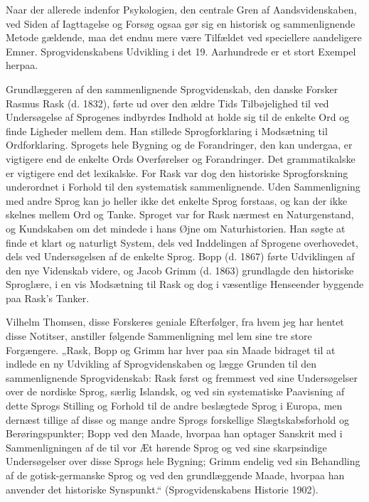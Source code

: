 \documentclass[12pt,a4paper,openany]{book}
\newcommand{\opage}[1]{\marginnote{\footnotesize\textit{[#1]}}}
\begin{document}
Naar der allerede indenfor Psykologien, den centrale Gren af
Aandsvidenskaben, ved Siden af Iagttagelse og Forsøg ogsaa gør sig
en historisk og sammenlignende Metode gældende, maa det endnu
mere være Tilfældet ved speciellere aandeligere Emner. Sprogvidenskabens
Udvikling i det 19. Aarhundrede er et stort Exempel herpaa.


Grundlæggeren af den sammenlignende Sprogvidenskab, den danske
Forsker Rasmus Rask (d. 1832), førte ud over den ældre Tids
Tilbøjelighed til ved Undersøgelse af Sprogenes indbyrdes Indhold at
holde sig til de enkelte Ord og finde Ligheder mellem dem. Han
stillede Sprogforklaring i Modsætning til Ordforklaring. Sprogets
hele Bygning og de Forandringer, den kan undergaa, er vigtigere
end de enkelte Ords Overførelser og Forandringer. Det grammatikalske
er vigtigere end det lexikalske. For Rask var dog den historiske
Sprogforskning underordnet i Forhold til den systematisk
sammenlignende. Uden Sammenligning med andre Sprog kan jo heller
ikke det enkelte Sprog forstaas, og kan der ikke skelnes mellem
Ord og Tanke. Sproget var for Rask nærmest en Naturgenstand, og
Kundskaben om det mindede i hans Øjne om Naturhistorien. Han
søgte at finde et klart og naturligt System, dels ved Inddelingen af
Sprogene overhovedet, dels ved Undersøgelsen af de enkelte Sprog.
Bopp (d. 1867) førte Udviklingen af den nye Videnskab videre, og
Jacob Grimm (d. 1863) grundlagde den historiske Sproglære, i en
vis Modsætning til Rask og dog i væsentlige Henseender byggende
paa Rask’s Tanker.

Vilhelm Thomsen, disse Forskeres geniale Efterfølger, fra hvem
jeg har hentet disse Notitser, anstiller følgende Sammenligning mel%
\opage{54}lem sine tre store Forgængere. „Rask, Bopp og Grimm har hver paa
sin Maade bidraget til at indlede en ny Udvikling af Sprogvidenskaben
og lægge Grunden til den sammenlignende Sprogvidenskab:
Rask først og fremmest ved sine Undersøgelser over de nordiske
Sprog, særlig Islandsk, og ved sin systematiske Paavisning af dette
Sprogs Stilling og Forhold til de andre beslægtede Sprog i Europa,
men dernæst tillige af disse og mange andre Sprogs forskellige Slægtskabsforhold
og Berøringspunkter; Bopp ved den Maade, hvorpaa
han optager Sanskrit med i Sammenligningen af de til vor Æt hørende
Sprog og ved sine skarpsindige Undersøgelser over disse Sprogs
hele Bygning; Grimm endelig ved sin Behandling af de gotisk-germanske
Sprog og ved den grundlæggende Maade, hvorpaa han anvender
det historiske Synspunkt.“ (Sprogvidenskabens Historie
1902).
\end{document}
